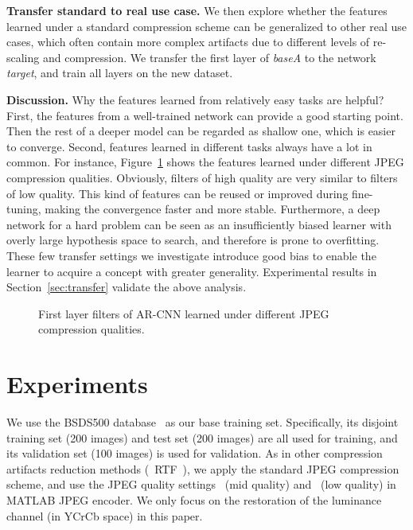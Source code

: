 \documentclass[10pt,twocolumn,letterpaper]{article}
\begin{document}
\textbf{Transfer standard to real use case.}
We then explore whether the features learned under a standard compression scheme can be generalized to other real use cases, which often contain more complex artifacts due to different levels of re-scaling and compression. We transfer the first layer of \textit{baseA} to the network \textit{target}, and train all layers on the new dataset.

\textbf{Discussion.}
Why the features learned from relatively easy tasks are helpful? First, the features from a well-trained network can provide a good starting point. Then the rest of a deeper model can be regarded as shallow one, which is easier to converge. Second, features learned in different tasks always have a lot in common. For instance, Figure~\ref{fig:features} shows the features learned under different JPEG compression qualities. Obviously, filters  of high quality are very similar to filters  of low quality. This kind of features can be reused or improved during fine-tuning, making the convergence faster and more stable. Furthermore, a deep network for a hard problem can be seen as an insufficiently biased learner with overly large hypothesis space to search, and therefore is prone to overfitting. These few transfer settings we investigate introduce good bias to enable the learner to acquire a concept with greater generality. Experimental results in Section~\ref{sec:transfer} validate the above analysis.

\begin{figure}[t]\tiny
\centering
{}
\vskip -0.2cm
\vskip -0.16cm
\label{fig:features}
  \caption{First layer filters of AR-CNN learned under different JPEG compression qualities.}
\vskip -0.4cm
\end{figure}


\section{Experiments}
\label{subsec:settings}
We use the BSDS500 database~\cite{Arbelaez2011} as our base training set. Specifically, its disjoint training set (200 images) and test set (200 images) are all used for training, and its validation set (100 images) is used for validation.
As in other compression artifacts reduction methods (\eg~RTF~\cite{Jancsary2012}), we apply the standard JPEG compression scheme, and use the JPEG quality settings ~(mid quality) and ~(low quality) in MATLAB JPEG encoder. We only focus on the restoration of the luminance channel (in YCrCb space) in this paper.
\end{document}
